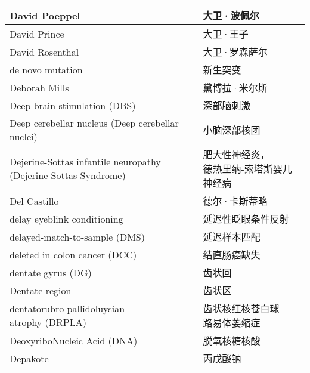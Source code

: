 \begin{longtable}{lll}
	\midrule
	David Poeppel     &&  大卫·波佩尔  \\
	
	\midrule
	David Prince     &&  大卫·王子  \\
	
	\midrule
	David Rosenthal     &&  大卫·罗森萨尔  \\
	
	\midrule
	de novo mutation     &&  新生突变  \\
	
	\midrule
	Deborah Mills     &&  黛博拉·米尔斯  \\
	
	\midrule
	Deep brain stimulation (DBS)     &&  深部脑刺激  \\
	
	\midrule
	Deep cerebellar nucleus  (Deep 	cerebellar nuclei)   &&  小脑深部核团  \\
	
	\midrule
	\makecell[l]{Dejerine-Sottas infantile neuropathy \\ (Dejerine-Sottas Syndrome)}  &&  \makecell{肥大性神经炎，\\德热里纳-索塔斯婴儿神经病}  \\
	
	\midrule
	Del Castillo   &&  德尔·卡斯蒂略  \\
	
	\midrule
	delay eyeblink conditioning   &&  延迟性眨眼条件反射  \\
	
	\midrule
	delayed-match-to-sample  (DMS)   &&  延迟样本匹配  \\
	
	\midrule
	deleted in colon cancer (DCC)     &&  结直肠癌缺失  \\
	
	\midrule
	dentate gyrus (DG)     && 齿状回 \\
	
	\midrule
	Dentate region     && 齿状区 \\
	
	\midrule
	\makecell[l]{dentatorubro-pallidoluysian\\ atrophy (DRPLA)}     &&  \makecell[l]{齿状核红核苍白球\\路易体萎缩症}  \\
	
	\midrule
	DeoxyriboNucleic Acid (DNA)     &&  脱氧核糖核酸  \\
	
	\midrule
	Depakote     &&  丙戊酸钠  \\
	

\end{longtable}
